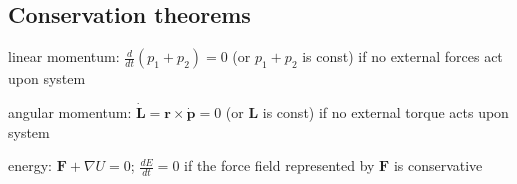 \documentclass[letterpaper,landscape,10pt]{article}
\newenvironment{mydescription}
{\begin{description}
	\setlength{\itemsep}{0pt}
	\setlength{\parskip}{0pt}
	\setlength{\parsep}{-1pt}}
{\end{description}}
\begin{document}
{\begin{multicols}{4}
	
	\subsection*{Conservation theorems}
		\begin{mydescription}
			\item[linear momentum:]
				$\frac{d}{dt}\left(p_1 + p_2\right) = 0$ (or $p_1+p_2$ is const)
				if no external forces act upon system  \\
			\item[angular momentum:]
				$\dot{\bm{L}}=\bm{r}\times\dot{\bm{p}}=0$ (or $\bm{L}$ is
				const) if no external torque acts upon system \\
			\item[energy:]
				$\bm{F}+\nabla U = 0$; $\frac{dE}{dt} = 0$ if the force field
				represented by $\bm{F}$ is conservative
		\end{mydescription}
	

\end{multicols}}
\end{document}
